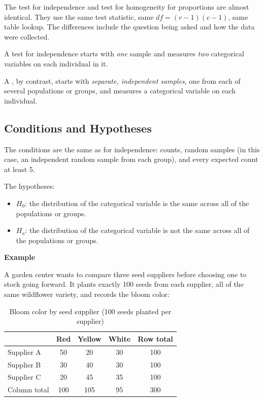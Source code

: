 The test for independence and test for homogeneity for proportions are almost identical. They use the same test statistic, same $df = (r-1)(c-1)$, same table lookup. The differences include the question being asked and how the data were collected.

A test for independence starts with \emph{one} sample and measures \emph{two} categorical variables on each individual in it.

A , by contrast, starts with \emph{separate, independent samples}, one from each of several populations or groups, and measures a categorical variable on each individual. 

\subsection{Conditions and Hypotheses}

The conditions are the same as for independence: counts, random samples (in this case, an independent random sample from each group), and every expected count at least 5. 

The hypotheses:

\begin{itemize}
    \item $H_0$: the distribution of the categorical variable is the same across all of the populations or groups.
    \item $H_a$: the distribution of the categorical variable is not the same across all of the populations or groups.
\end{itemize}


\textbf{ Example}

A garden center wants to compare three seed suppliers before choosing one to stock going forward. It plants exactly 100 seeds from each supplier, all of the same wildflower variety, and records the bloom color:

\begin{table}[H]
\centering
\caption{Bloom color by seed supplier (100 seeds planted per supplier)}
\begin{tabular}{l|ccc|c}
 & Red & Yellow & White & Row total \\
\hline
Supplier A & 50 & 20 & 30 & 100 \\
Supplier B & 30 & 40 & 30 & 100 \\
Supplier C & 20 & 45 & 35 & 100 \\
\hline
Column total & 100 & 105 & 95 & 300 \\
\end{tabular}
\end{table}

